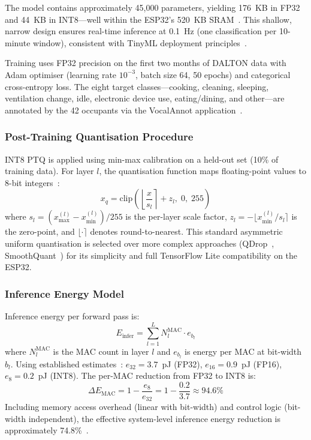 The model contains approximately 45,000 parameters, yielding 176~KB in FP32 and 44~KB in INT8---well within the ESP32's 520~KB SRAM~\cite{karmakar2024exploring}. This shallow, narrow design ensures real-time inference at 0.1~Hz (one classification per 10-minute window), consistent with TinyML deployment principles~\cite{akhyar2025tinyml, tinytrain2024}.

Training uses FP32 precision on the first two months of DALTON data with Adam optimiser (learning rate $10^{-3}$, batch size 64, 50 epochs) and categorical cross-entropy loss. The eight target classes---cooking, cleaning, sleeping, ventilation change, idle, electronic device use, eating/dining, and other---are annotated by the 42 occupants via the VocalAnnot application~\cite{karmakar2024exploring, karmakar2024indoor}.

\subsubsection{Post-Training Quantisation Procedure}

INT8 PTQ is applied using min-max calibration on a held-out set (10\% of training data). For layer $l$, the quantisation function maps floating-point values to 8-bit integers~\cite{nagel2021whitepaper, quantsurvey2021}:
\begin{equation}
    x_q = \text{clip}\left(\left\lfloor \frac{x}{s_l} \right\rceil + z_l, \; 0, \; 255\right)
    \label{eq:ptq}
\end{equation}
where $s_l = (x_{\max}^{(l)} - x_{\min}^{(l)}) / 255$ is the per-layer scale factor, $z_l = -\lfloor x_{\min}^{(l)} / s_l \rceil$ is the zero-point, and $\lfloor \cdot \rceil$ denotes round-to-nearest. This standard asymmetric uniform quantisation is selected over more complex approaches (QDrop~\cite{qdrop2023}, SmoothQuant~\cite{smoothquant2024}) for its simplicity and full TensorFlow Lite compatibility on the ESP32.

\subsubsection{Inference Energy Model}

Inference energy per forward pass is:
\begin{equation}
    E_{\text{infer}} = \sum_{l=1}^{L} N_l^{\text{MAC}} \cdot e_{b_l}
    \label{eq:inferenergy}
\end{equation}
where $N_l^{\text{MAC}}$ is the MAC count in layer $l$ and $e_{b_l}$ is energy per MAC at bit-width $b_l$. Using established estimates~\cite{guo2020fixedpoint, vsquant2021}: $e_{32} = 3.7$~pJ (FP32), $e_{16} = 0.9$~pJ (FP16), $e_8 = 0.2$~pJ (INT8). The per-MAC reduction from FP32 to INT8 is:
\begin{equation}
    \Delta E_{\text{MAC}} = 1 - \frac{e_8}{e_{32}} = 1 - \frac{0.2}{3.7} \approx 94.6\%
    \label{eq:macsaving}
\end{equation}
Including memory access overhead (linear with bit-width) and control logic (bit-width independent), the effective system-level inference energy reduction is approximately 74.8\%~\cite{enhancingcnn2024, edgempq2024}.


